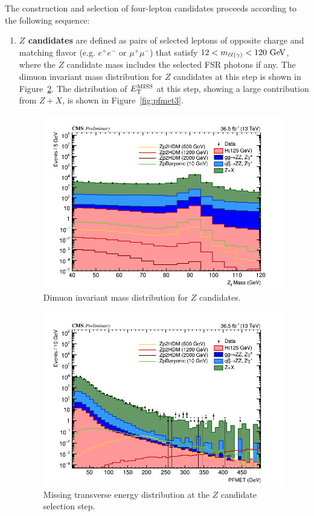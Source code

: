The construction and selection of four-lepton candidates proceeds 
according to the following sequence:
\begin{enumerate}
\item {\bf $Z$ candidates} are defined as pairs of selected leptons
 of opposite charge and matching flavor (e.g. $e^+ e^-$ or $\mu^+\mu^-$)
 that satisfy $12 < m_{\ell\ell(\gamma)} < 120~\mathrm{Ge\kern -0.1em V}$, where the $Z$ candidate mass
 includes the selected FSR photons if any. The dimuon invariant mass distribution for $Z$ candidates at this step is shown in Figure~\ref{fig:dimuonz}. The distribution of $E_{\rm{T}}^{\rm{MISS}}$ at this step, showing a large contribution from $Z+X$, is shown in Figure~\ref{fig:pfmet3}.

\begin{figure}[tbh]
\centering
\includegraphics[width=5.5in]{figures/hist_hMZ_3.png}
    \caption{Dimuon invariant mass distribution for $Z$ candidates.}
    \label{fig:dimuonz}
\end{figure}

\begin{figure}[tbh]
\centering
\includegraphics[width=5.5in]{figures/hist_hPFMET_3.png}
    \caption{Missing transverse energy distribution at the $Z$ candidate selection step.}
    \label{fig:dimuonz}
\end{figure}


\end{enumerate}
